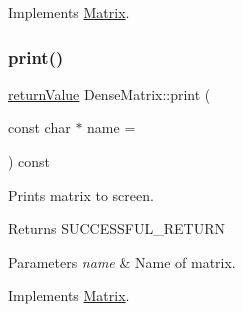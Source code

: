 Implements \hyperlink{class_matrix_a1f5595f0147658d9f79f92dd283dcbac}{Matrix}.

\mbox{\label{class_dense_matrix_a248f137d9f0f1cd385d9c73a847bf88e}} 
\subsubsection{\texorpdfstring{print()}{print()}}
{\footnotesize\ttfamily \hyperlink{_message_handling_8hpp_a81d556f613bfbabd0b1f9488c0fa865e}{return\+Value} Dense\+Matrix\+::print (\begin{DoxyParamCaption}\item[{const char $\ast$}]{name = {} }\end{DoxyParamCaption}) const\hspace{0.3cm}{\ttfamily [virtual]}}

Prints matrix to screen. \begin{DoxyReturn}{Returns}
S\+U\+C\+C\+E\+S\+S\+F\+U\+L\+\_\+\+R\+E\+T\+U\+RN 
\end{DoxyReturn}

\begin{DoxyParams}{Parameters}
{\em name} & Name of matrix. \\
\hline
\end{DoxyParams}


Implements \hyperlink{class_matrix_acc4e1dc7fa487a0c2638d88236fe35f8}{Matrix}.

\mbox{\label{class_dense_matrix_aaf90deee21a9d6d8bf5b6fd662b5fec6}} 
